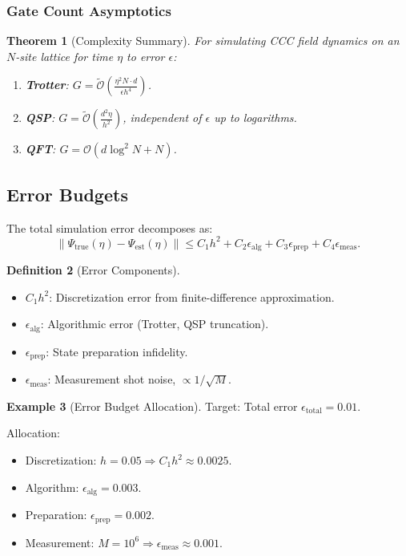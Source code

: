\documentclass[11pt,a4paper]{article}
\newcommand{\Order}{\mathcal{O}}
\newcommand{\Otilde}{\widetilde{\mathcal{O}}}
\theoremstyle{plain}
\newtheorem{theorem}{Theorem}[section]
\theoremstyle{definition}
\newtheorem{definition}[theorem]{Definition}
\newtheorem{example}[theorem]{Example}
\theoremstyle{remark}
\begin{document}
\subsubsection{Gate Count Asymptotics}

\begin{theorem}[Complexity Summary]\label{thm:complexity}
For simulating CCC field dynamics on an $N$-site lattice for time $\eta$ to error $\epsilon$:
\begin{enumerate}
    \item \textbf{Trotter}: $G = \Otilde\left(\frac{\eta^2 N \cdot d}{\epsilon h^4}\right)$.
    \item \textbf{QSP}: $G = \Otilde\left(\frac{d^2 \eta}{h^2}\right)$, independent of $\epsilon$ up to logarithms.
    \item \textbf{QFT}: $G = \Order(d \log^2 N + N)$.
\end{enumerate}
\end{theorem}

\subsection{Error Budgets}\label{subsec:error_budgets}

The total simulation error decomposes as:
\begin{equation}\label{eq:error_budget}
    \|\Psi_{\text{true}}(\eta) - \Psi_{\text{est}}(\eta)\| \leq C_1 h^2 + C_2 \epsilon_{\text{alg}} + C_3 \epsilon_{\text{prep}} + C_4 \epsilon_{\text{meas}}.
\end{equation}

\begin{definition}[Error Components]
\begin{itemize}
    \item $C_1 h^2$: Discretization error from finite-difference approximation.
    \item $\epsilon_{\text{alg}}$: Algorithmic error (Trotter, QSP truncation).
    \item $\epsilon_{\text{prep}}$: State preparation infidelity.
    \item $\epsilon_{\text{meas}}$: Measurement shot noise, $\propto 1/\sqrt{M}$.
\end{itemize}
\end{definition}

\begin{example}[Error Budget Allocation]
Target: Total error $\epsilon_{\text{total}} = 0.01$.

Allocation:
\begin{itemize}
    \item Discretization: $h = 0.05 \Rightarrow C_1 h^2 \approx 0.0025$.
    \item Algorithm: $\epsilon_{\text{alg}} = 0.003$.
    \item Preparation: $\epsilon_{\text{prep}} = 0.002$.
    \item Measurement: $M = 10^6 \Rightarrow \epsilon_{\text{meas}} \approx 0.001$.
\end{itemize}
\end{example}
\end{document}
